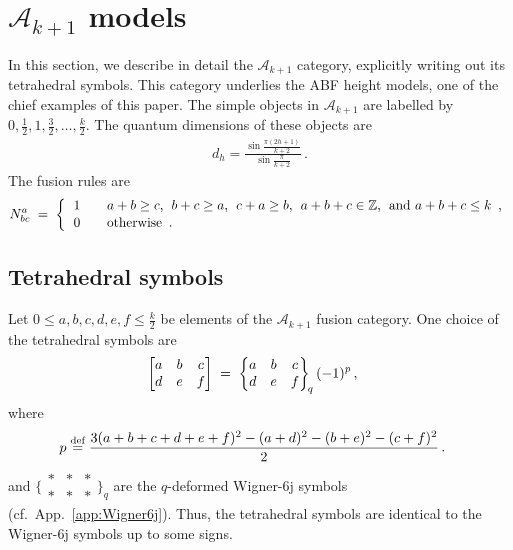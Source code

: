\clearpage
\appendix

\section{\texorpdfstring{$\mathcal{A}_{k+1}$}{A[k+1]} models}
\label{app:TetraSym}

In this section, we describe in detail the $\mathcal{A}_{k+1}$ category, explicitly writing out its tetrahedral symbols. This category underlies the ABF height models, one of the chief examples of this paper.
The simple objects in $\mathcal{A}_{k+1}$ are labelled by $0, \tfrac12, 1, \tfrac32, \dots, \tfrac{k}{2}$.
The quantum dimensions of these objects are
\begin{align}
	d_h = \frac{ \sin\frac{\pi(2h+1)}{k+2} }{ \sin\frac{\pi}{k+2} } \,.
\end{align}
The fusion rules are
\begin{align}
	N^a_{bc} \;=\; \bigg\{ \begin{tabular}{l @{\qquad} l}
		1	&	$a+b \geq c$,\; $b+c \geq a$,\; $c+a \geq b$,\; $a+b+c \in \mathbb{Z}$,\; and $a+b+c \leq k$ \,,
	\\[0.2ex]	0	&	otherwise \,.
	\end{tabular}
\end{align}


\subsection{Tetrahedral symbols}


Let $0 \leq a,b,c,d,e,f \leq \frac{k}{2}$ be elements of the $\mathcal{A}_{k+1}$ fusion category.
One choice of the tetrahedral symbols are~\cite{kauffman1993}
\begin{align}
	\begin{bmatrix} a & b & c \\ d & e & f \end{bmatrix}
   \;&=\;
	\begin{Bmatrix} a & b & c \\ d & e & f \end{Bmatrix}_{\!q} (-1)^p
	\label{eq:def_TetraSym} \,,
\end{align}
where
\begin{align}
	p &\mathrel{\overset{\textrm{def}}{=}} \frac{ 3(a+b+c+d+e+f)^2 - (a+d)^2 - (b+e)^2 - (c+f)^2 }{2} \,.
\end{align}
and $\{\!\begin{smallmatrix} *&*&* \\ *&*&* \end{smallmatrix}\!\}_q$ are the $q$-deformed Wigner-6j symbols (cf.\ App.~\ref{app:Wigner6j}).
Thus, the tetrahedral symbols are identical to the Wigner-6j symbols up to some signs.




